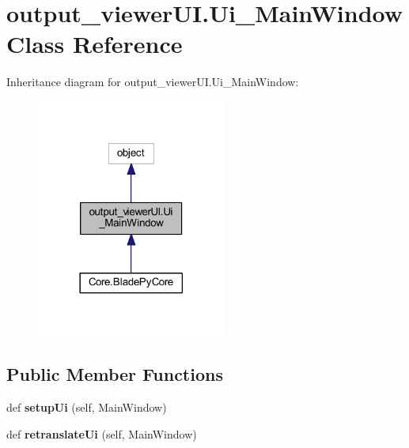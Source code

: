 \hypertarget{a00105}{}\section{output\+\_\+viewer\+U\+I.\+Ui\+\_\+\+Main\+Window Class Reference}
\label{a00105}


Inheritance diagram for output\+\_\+viewer\+U\+I.\+Ui\+\_\+\+Main\+Window\+:
\nopagebreak
\begin{figure}[H]
\begin{center}
\leavevmode
\includegraphics[width=177pt]{a00104}
\end{center}
\end{figure}
\subsection*{Public Member Functions}
\begin{DoxyCompactItemize}
\item 
\hypertarget{a00105_a2a9ce5c092ffe5a4e4cabb341be7ceb4}{}\label{a00105_a2a9ce5c092ffe5a4e4cabb341be7ceb4} 
def {\bfseries setup\+Ui} (self, Main\+Window)
\item 
\hypertarget{a00105_a96efd9219a406e801e268b7add32cb78}{}\label{a00105_a96efd9219a406e801e268b7add32cb78} 
def {\bfseries retranslate\+Ui} (self, Main\+Window)
\end{DoxyCompactItemize}
